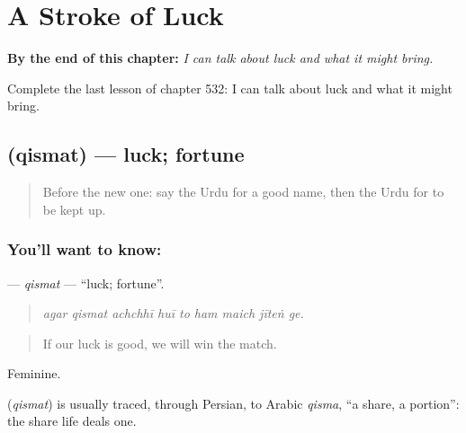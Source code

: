 
\chapter{A Stroke of Luck}
\label{ch:ur-a-stroke-of-luck}

\begin{chapteropening}
\textbf{By the end of this chapter:} \emph{I can talk about luck and what it might bring.}

Complete the last lesson of chapter 532: I can talk about luck and what it might bring.
\end{chapteropening}

\section[\texorpdfstring{\ur{قسمت} (qismat)}{قسمت (qismat)}]{ (qismat) — luck; fortune}

\label{lesson:UR-C532-qismat}



\begin{quote}
Before the new one: say the Urdu for a good name, then the Urdu for to be kept up.
\end{quote}

\subsection*{You'll want to know: }
\textbf{} — \emph{qismat} — \textquotedblleft{}luck; fortune\textquotedblright{}.

\begin{quote}
        
\end{quote}

\begin{quote}
\emph{agar qismat achchhī huī to ham maich jīteṅ ge.}
\end{quote}

\begin{quote}
If our luck is good, we will win the match.
\end{quote}

Feminine.

\begin{cousinweb}
\textbf{} (\emph{qismat}) is usually traced, through Persian, to Arabic \emph{qisma}, \textquotedblleft{}a share, a portion\textquotedblright{}: the share life deals one.
\end{cousinweb}

